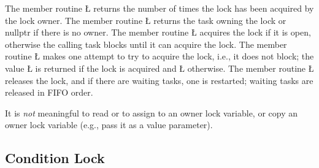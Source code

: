\documentclass[openright,twoside]{report}
\begin{document}
The member routine \LGinlinetrue\LGbegin\lgrinde\L{}\endlgrinde\LGend{} returns the number of times the lock has been acquired by the lock owner.
The member routine \LGinlinetrue\LGbegin\lgrinde\L{}\endlgrinde\LGend{} returns the task owning the lock or nullptr if there is no owner.
The member routine \LGinlinetrue\LGbegin\lgrinde\L{}\endlgrinde\LGend{} acquires the lock if it is open, otherwise the calling task blocks until it can acquire the lock.
The member routine \LGinlinetrue\LGbegin\lgrinde\L{}\endlgrinde\LGend{} makes one attempt to try to acquire the lock, i.e., it does not block;
the value \LGinlinetrue\LGbegin\lgrinde\L{}\endlgrinde\LGend{} is returned if the lock is acquired and \LGinlinetrue\LGbegin\lgrinde\L{}\endlgrinde\LGend{} otherwise.
The member routine \LGinlinetrue\LGbegin\lgrinde\L{}\endlgrinde\LGend{} releases the lock, and if there are waiting tasks, one is restarted;
waiting tasks are released in FIFO order.

It is \emph{not} meaningful to read or to assign to an owner lock variable, or copy an owner lock variable (e.g., pass it as a value parameter).


\subsection{Condition Lock}
\label{s:ConditionLock}
\end{document}
